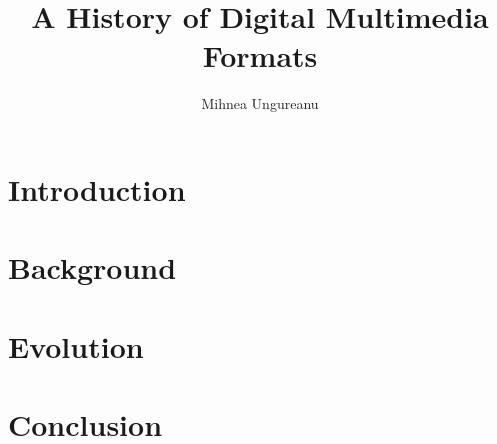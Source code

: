 \documentclass[12pt]{report}
\title{
    {A History of Digital Multimedia Formats}
}
\author{Mihnea Ungureanu}
\begin{document}
\maketitle

\tableofcontents

\chapter{Introduction}


\chapter{Background}


\chapter{Evolution}


\chapter{Conclusion}



\end{document}
